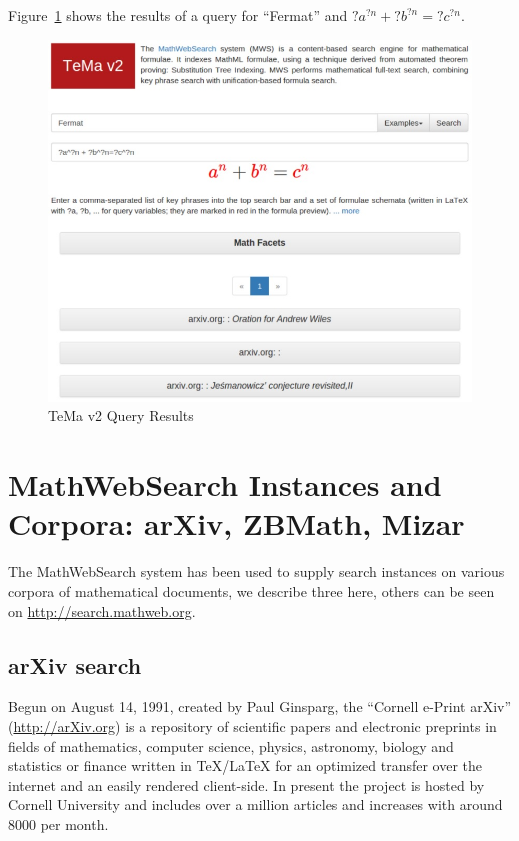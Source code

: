 \documentclass{deliverablereport}
\def\MWS{\textsf{MathWebSearch}\xspace}
\begin{document}
Figure~\ref{fig:temav2query} shows the results of a query for “Fermat” and $?a^{?n}+?b^{?n}=?c^{?n}$.

\begin{figure}[H]
\centering
 \includegraphics[scale=0.6]{figure7.jpg}
 \caption{TeMa v2 Query Results}
 \label{fig:temav2query}
\end{figure}


\section{\MWS Instances and Corpora: arXiv, ZBMath, Mizar}\label{arxiv}

The \MWS system has been used to supply search instances on various corpora of
mathematical documents, we describe three here, others can be seen on
\url{http://search.mathweb.org}. 

\subsection{arXiv search}

Begun on August 14, 1991, created by Paul Ginsparg, the ``Cornell e-Print arXiv''
(\url{http://arXiv.org}) is a repository of scientific papers and electronic preprints in
fields of mathematics, computer science, physics, astronomy, biology and statistics or
finance written in {\TeX/\LaTeX} for an optimized transfer over the internet and an easily
rendered client-side. In present the project is hosted by Cornell University and includes
over a million articles and increases with around 8000 per month.
\end{document}
